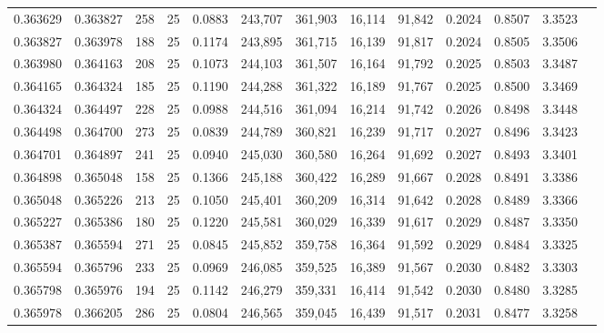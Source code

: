 \begin{tabular}{rrrrrrrrrrrrr}
0.363629 & 0.363827 &   258 &  25 &                                     0.0883 & 243,707 & 361,903 &  16,114 &  91,842 & 0.2024 & 0.8507 & 3.3523 \\
0.363827 & 0.363978 &   188 &  25 &                                     0.1174 & 243,895 & 361,715 &  16,139 &  91,817 & 0.2024 & 0.8505 & 3.3506 \\
0.363980 & 0.364163 &   208 &  25 &                                     0.1073 & 244,103 & 361,507 &  16,164 &  91,792 & 0.2025 & 0.8503 & 3.3487 \\
0.364165 & 0.364324 &   185 &  25 &                                     0.1190 & 244,288 & 361,322 &  16,189 &  91,767 & 0.2025 & 0.8500 & 3.3469 \\
0.364324 & 0.364497 &   228 &  25 &                                     0.0988 & 244,516 & 361,094 &  16,214 &  91,742 & 0.2026 & 0.8498 & 3.3448 \\
0.364498 & 0.364700 &   273 &  25 &                                     0.0839 & 244,789 & 360,821 &  16,239 &  91,717 & 0.2027 & 0.8496 & 3.3423 \\
0.364701 & 0.364897 &   241 &  25 &                                     0.0940 & 245,030 & 360,580 &  16,264 &  91,692 & 0.2027 & 0.8493 & 3.3401 \\
0.364898 & 0.365048 &   158 &  25 &                                     0.1366 & 245,188 & 360,422 &  16,289 &  91,667 & 0.2028 & 0.8491 & 3.3386 \\
0.365048 & 0.365226 &   213 &  25 &                                     0.1050 & 245,401 & 360,209 &  16,314 &  91,642 & 0.2028 & 0.8489 & 3.3366 \\
0.365227 & 0.365386 &   180 &  25 &                                     0.1220 & 245,581 & 360,029 &  16,339 &  91,617 & 0.2029 & 0.8487 & 3.3350 \\
0.365387 & 0.365594 &   271 &  25 &                                     0.0845 & 245,852 & 359,758 &  16,364 &  91,592 & 0.2029 & 0.8484 & 3.3325 \\
0.365594 & 0.365796 &   233 &  25 &                                     0.0969 & 246,085 & 359,525 &  16,389 &  91,567 & 0.2030 & 0.8482 & 3.3303 \\
0.365798 & 0.365976 &   194 &  25 &                                     0.1142 & 246,279 & 359,331 &  16,414 &  91,542 & 0.2030 & 0.8480 & 3.3285 \\
0.365978 & 0.366205 &   286 &  25 &                                     0.0804 & 246,565 & 359,045 &  16,439 &  91,517 & 0.2031 & 0.8477 & 3.3258 \\

\end{tabular}

